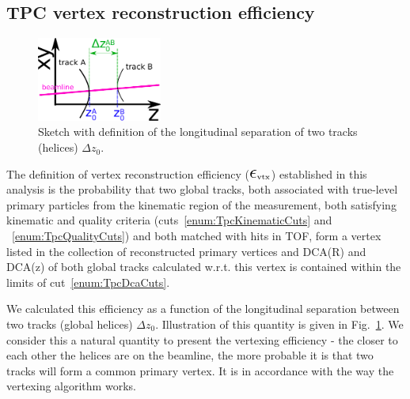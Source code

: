 \newpage
\subsection{TPC vertex reconstruction efficiency}\label{sec:tpcVxRecoEff}

\begin{figure}\vspace*{-9pt}
  \centering
  \includegraphics[width=0.365\textwidth]{graphics/corrections/deltaZ0Definition2.pdf}
  \caption[Sketch with definition of $\Delta z_{0}$.]
   {Sketch with definition of the longitudinal separation of two tracks (helices) $\Delta z_{0}$.}
   \label{fig:deltaZ0Sketch}\vspace*{-9pt} 
\end{figure}

The definition of vertex reconstruction efficiency ($\mbox{\LARGE$\epsilon$}_{\text{vtx}}$) established in this analysis is the probability that two global tracks, both associated with true-level primary particles from the kinematic region of the measurement, both satisfying kinematic and quality criteria (cuts~\ref{enum:TpcKinematicCuts} and ~\ref{enum:TpcQualityCuts}) and both matched with hits in TOF, form a vertex listed in the collection of reconstructed primary vertices and DCA(R) and DCA(z) of both global tracks calculated w.r.t. this vertex is contained within the limits of cut~\ref{enum:TpcDcaCuts}.

We calculated this efficiency as a function of the longitudinal separation between two tracks (global helices) $\Delta z_{0}$. Illustration of this quantity is given in Fig.~\ref{fig:deltaZ0Sketch}. We consider this a natural quantity to present the vertexing efficiency - the closer to each other the helices are on the beamline, the more probable it is that two tracks will form a common primary vertex. It is in accordance with the way the vertexing algorithm works.


